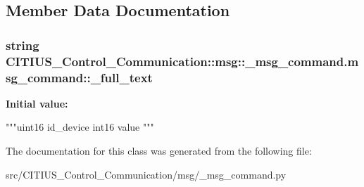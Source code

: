 \subsection{\-Member \-Data \-Documentation}
\hypertarget{class_c_i_t_i_u_s___control___communication_1_1msg_1_1__msg__command_1_1msg__command_acaf25ba3e5154e1a945ac4de702df22f}{
\subsubsection[{\-\_\-full\-\_\-text}]{\setlength{\rightskip}{0pt plus 5cm}string \-C\-I\-T\-I\-U\-S\-\_\-\-Control\-\_\-\-Communication\-::msg\-::\-\_\-msg\-\_\-command.\-msg\-\_\-command\-::\-\_\-full\-\_\-text}}\label{class_c_i_t_i_u_s___control___communication_1_1msg_1_1__msg__command_1_1msg__command_acaf25ba3e5154e1a945ac4de702df22f}
{\bfseries \-Initial value\-:}
\begin{DoxyCode}
"""uint16 id_device
int16 value
"""
\end{DoxyCode}


\-The documentation for this class was generated from the following file\-:\begin{DoxyCompactItemize}
\item 
src/\-C\-I\-T\-I\-U\-S\-\_\-\-Control\-\_\-\-Communication/msg/\-\_\-msg\-\_\-command.\-py\end{DoxyCompactItemize}
